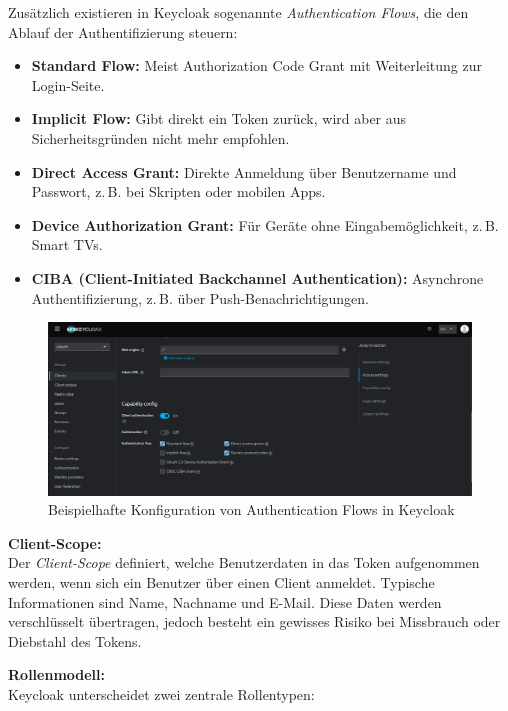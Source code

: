 \documentclass[a4paper,12pt]{article}
\begin{document}
	Zusätzlich existieren in Keycloak sogenannte \textit{Authentication Flows}, die den Ablauf der Authentifizierung steuern:
	
	\begin{itemize}
		\item \textbf{Standard Flow:} Meist Authorization Code Grant mit Weiterleitung zur Login-Seite.
		\item \textbf{Implicit Flow:} Gibt direkt ein Token zurück, wird aber aus Sicherheitsgründen nicht mehr empfohlen.
		\item \textbf{Direct Access Grant:} Direkte Anmeldung über Benutzername und Passwort, z.\,B. bei Skripten oder mobilen Apps.
		\item \textbf{Device Authorization Grant:} Für Geräte ohne Eingabemöglichkeit, z.\,B. Smart TVs.
		\item \textbf{CIBA (Client-Initiated Backchannel Authentication):} Asynchrone Authentifizierung, z.\,B. über Push-Benachrichtigungen.
	\end{itemize}
	
	\begin{figure}[H]
		\centering
		\includegraphics[width=0.9\linewidth]{screenshot013}
		\caption{Beispielhafte Konfiguration von Authentication Flows in Keycloak}
		\label{fig:screenshot013}
	\end{figure}
	
	\vspace{0.5em}
	\textbf{Client-Scope:}\\
	Der \textit{Client-Scope} definiert, welche Benutzerdaten in das Token aufgenommen werden, wenn sich ein Benutzer über einen Client anmeldet. Typische Informationen sind Name, Nachname und E-Mail. Diese Daten werden verschlüsselt übertragen, jedoch besteht ein gewisses Risiko bei Missbrauch oder Diebstahl des Tokens.
	
	\vspace{0.5em}
	\textbf{Rollenmodell:}\\
	Keycloak unterscheidet zwei zentrale Rollentypen:
	
\end{document}

